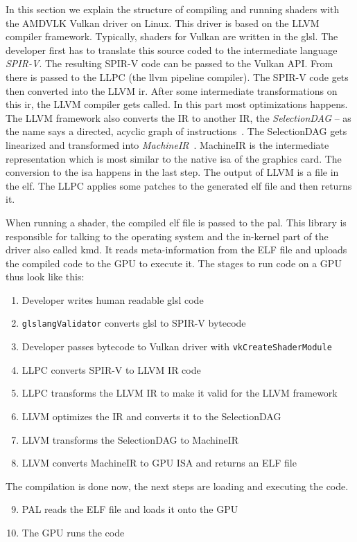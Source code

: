 In this section we explain the structure of compiling and running shaders with the AMDVLK Vulkan driver on Linux. This driver is based on the LLVM compiler framework. Typically, shaders for Vulkan are written in the \gls{glsl}. The developer first has to translate this source coded to the intermediate language \emph{SPIR-V}. The resulting SPIR-V code can be passed to the Vulkan API. From there is passed to the LLPC (the llvm pipeline compiler). The SPIR-V code gets then converted into the LLVM \gls{ir}. After some intermediate transformations on this \gls{ir}, the LLVM compiler gets called. In this part most optimizations happens.
The LLVM framework also converts the IR to another IR, the \emph{SelectionDAG} -- as the name says a directed, acyclic graph of instructions~\cite{llvmSelectionDag}. The SelectionDAG gets linearized and transformed into \emph{MachineIR}~\cite{llvmSelectionDag}. MachineIR is the intermediate representation which is most similar to the native \gls{isa} of the graphics card. The conversion to the \gls{isa} happens in the last step. The output of LLVM is a file in the \gls{elf}. The LLPC applies some patches to the generated \gls{elf} file and then returns it.

When running a shader, the compiled \gls{elf} file is passed to the \gls{pal}. This library is responsible for talking to the operating system and the in-kernel part of the driver also called \gls{kmd}. It reads meta-information from the ELF file and uploads the compiled code to the GPU to execute it. The stages to run code on a GPU thus look like this:

\begin{enumerate}
	\item Developer writes human readable \gls{glsl} code
	\item \texttt{glslangValidator} converts \gls{glsl} to SPIR-V bytecode
	\item Developer passes bytecode to Vulkan driver with \texttt{vkCreateShaderModule}
	\item LLPC converts SPIR-V to LLVM IR code
	\item LLPC transforms the LLVM IR to make it valid for the LLVM framework
	\item LLVM optimizes the IR and converts it to the SelectionDAG
	\item LLVM transforms the SelectionDAG to MachineIR
	\item LLVM converts MachineIR to GPU ISA and returns an ELF file
\end{enumerate}
The compilation is done now, the next steps are loading and executing the code.
\begin{enumerate}
	\setcounter{enumi}{8}
	\item PAL reads the ELF file and loads it onto the GPU
	\item The GPU runs the code
\end{enumerate}


